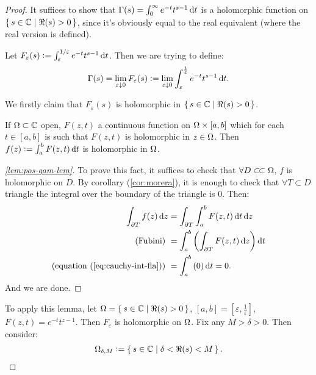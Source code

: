 \begin{proof}
It suffices to show that $\Gamma(s) = \int_0^\infty e^{-t} t^{s-1} \dif t$ is a holomorphic function on $\set{ s \in \mathbb{C}\mid \Re(s) > 0}$, since it's obviously equal to the real equivalent (where the real version is defined).

Let $F_\varepsilon (s) \defas \int_\varepsilon^{1/\varepsilon} e^{-t} t^{s-1} \dif t  $. Then we are trying to define:
\begin{align*}
 \Gamma(s) = \lim_{\varepsilon \downarrow 0} F_\varepsilon (s) \defas \lim_{\varepsilon \downarrow 0} \int_\varepsilon^\frac{1}{\varepsilon} e^{-t} t^{s-1} \dif t .
\end{align*}

We firstly claim that $F_\varepsilon(s)$ is holomorphic in $\set{ s \in \mathbb{C}\mid \Re(s) > 0}$.


\begin{lemma}\label{lem:pos-gam-lem}
If $\Omega \subset \mathbb{C}$ open, $F(z,t)$ a continuous function on $\Omega \times [a,b]$ which for each $t \in [a,b]$ is such that $F(z,t)$ is holomorphic in $z \in \Omega$. Then $f(z) \defas \int_a^b F(z,t) \dif t$ is holomorphic in $\Omega$.

\end{lemma}


\begin{proof}[\ref{lem:pos-gam-lem}]
To prove this fact, it suffices to check that $\forall D \ssubset \om$, $f$ is holomorphic on $D$. By corollary (\ref{cor:morera}), it is enough to check that $\forall T \subset D$ triangle the integral over the boundary of the triangle is $0$. Then:
\begin{align*}
    \int_{\partial T} f(z) \dif z &= \int_{\partial T} \int_a^b F(z,t) \dif t \dif z\\
    \text{(Fubini) } &=  \int_a^b \br{ \int_{\partial T} F(z,t) \dif z } \dif t \\
    \text{(equation (\ref{eq:cauchy-int-fla})) } &= \int_a^b \br{0} \dif t = 0.
\end{align*}
And we are done.
\end{proof}

To apply this lemma, let $\Omega = \set{ s \in \mathbb{C}\mid \Re(s) > 0}$, $[a,b] = [\varepsilon, \frac{1}{\varepsilon} ]$, $F(z,t) = e^{-t} t^{z-1} $. Then $F_\varepsilon$ is holomorphic on $\Omega$. Fix any $M > \delta >0$. Then consider:
\begin{align*}
    \Omega_{\delta, M} \vcentcolon = \set{s \in \mathbb{C}\mid \delta < \Re(s) < M}.
\end{align*}


\end{proof}
